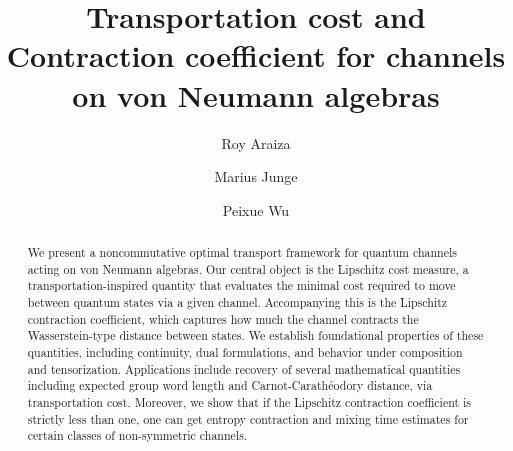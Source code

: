 \documentclass[11pt,reqno]{amsart}
\title{Transportation cost and Contraction coefficient for channels on von Neumann algebras} %
\author[R. Araiza]{Roy Araiza}
\author[M. Junge]{Marius Junge}
\author[P. Wu]{Peixue Wu}
\numberwithin{equation}{section}
\begin{document}
\begin{abstract}
We present a noncommutative optimal transport framework for quantum channels acting on von Neumann algebras. Our central object is the Lipschitz cost measure, a transportation-inspired quantity that evaluates the minimal cost required to move between quantum states via a given channel. Accompanying this is the Lipschitz contraction coefficient, which captures how much the channel contracts the Wasserstein-type distance between states. We establish foundational properties of these quantities, including continuity, dual formulations, and behavior under composition and tensorization. Applications include recovery of several mathematical quantities including expected group word length and Carnot-Carath\'eodory distance, via transportation cost. Moreover, we show that if the Lipschitz contraction coefficient is strictly less than one, one can get entropy contraction and mixing time estimates for certain classes of non-symmetric channels. 

\end{abstract}

\end{document}
